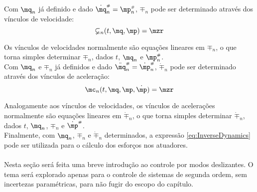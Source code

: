 Com $\mq_n$ j\'a definido e dado $\dot{\mq}_n\ssh = \mp_n\ssh$, $\mp_n$ pode ser determinado atrav\'es dos v\'inculos de velocidade:
\begin{equation} \label{eq:VelocityConstraints}
\mathbb{\psi}_n (t, \mq, \mp) = \mzr
\end{equation}


Os v\'inculos de velocidades normalmente s\~ao equa\c{c}\~oes lineares em $\mp_n$, o que torna simples determinar $\mp_n$, dados $t$, $\mq_n$ e $\mp_n\ssh$. \\

Com $\mq_n$ e $\mp_n$ j\'a definidos e dado $\ddot{\mq}_n\ssh = \dot{\mp}_n\ssh$, $\dot{\mp}_n$ pode ser determinado atrav\'es dos v\'inculos de acelera\c{c}\~ao:
\begin{equation} \label{eq:AccelerationConstraints}
\mc_n (t, \mq, \mp, \dot{\mp}) = \mzr
\end{equation}


Analogamente aos v\'inculos de velocidades, os v\'inculos de acelera\c{c}\~oes normalmente s\~ao equa\c{c}\~oes lineares em $\dot{\mp}_n$, o que torna simples determinar $\dot{\mp}_n$, dados $t$, $\mq_n$, $\mp_n$ e $\dot{\mp}\ssh$. \\

Finalmente, com $\mq_n$, $\mp_n$ e $\dot{\mp}_n$ determinados, a express\~ao \eqref{eq:InverseDynamics} pode ser utilizada para o c\'alculo dos esfor\c{c}os nos atuadores. \\


 
\\

Nesta se\c{c}\~ao ser\'a feita uma breve introdu\c{c}\~ao ao controle por modos deslizantes. O tema ser\'a explorado apenas para o controle de sistemas de segunda ordem, sem incertezas param\'etricas, para n\~ao fugir do escopo do cap\'itulo. \\

